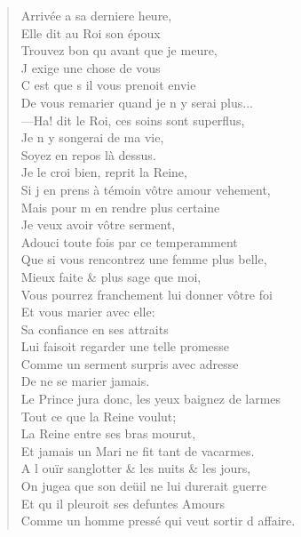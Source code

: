 \documentclass[14pt,a4paper]{memoir}
\begin{document}
{{\begin{otherlanguage}{french}
\begin{verse}
\vin Arrivée a sa derniere heure, \\
\vin Elle dit au Roi son époux \\
\vin Trouvez bon qu\textquotesingle{} avant que je meure, \\
\vin J\textquotesingle{} exige une chose de vous \\
\vin C\textquotesingle{} est que s\textquotesingle{} il vous prenoit envie \\
De vous remarier quand je n\textquotesingle{} y serai plus... \\
\vin —Ha! dit le Roi, ces soins sont superflus, \\
\vin Je n\textquotesingle{} y songerai de ma vie, \\
\vin Soyez en repos là dessus. \\
\vin Je le croi bien, reprit la Reine, \\
Si j\textquotesingle{} en prens à témoin vôtre amour vehement, \\
\vin Mais pour m\textquotesingle{} en rendre plus certaine \\
\vin Je veux avoir vôtre serment, \\
Adouci toute fois par ce temperamment \\
Que si vous rencontrez une femme plus belle, \\
\vin Mieux faite \& plus sage que moi, \\
Vous pourrez franchement lui donner vôtre foi \\
\vin Et vous marier avec elle: \\
\vin Sa confiance en ses attraits \\
Lui faisoit regarder une telle promesse \\
\vin Comme un serment surpris avec adresse \\
\vin De ne se marier jamais. \\
Le Prince jura donc, les yeux baignez de larmes \\
\vin Tout ce que la Reine voulut; \\
\vin La Reine entre ses bras mourut, \\
Et jamais un Mari ne fit tant de vacarmes. \\
A l\textquotesingle{} ouïr sanglotter \& les nuits \& les jours, \\
On jugea que son deüil ne lui durerait guerre \\
\vin Et qu\textquotesingle{} il pleuroit ses defuntes Amours \\
Comme un homme pressé qui veut sortir d\textquotesingle{} affaire. \\

\end{verse}
\end{otherlanguage}}}
\end{document}
